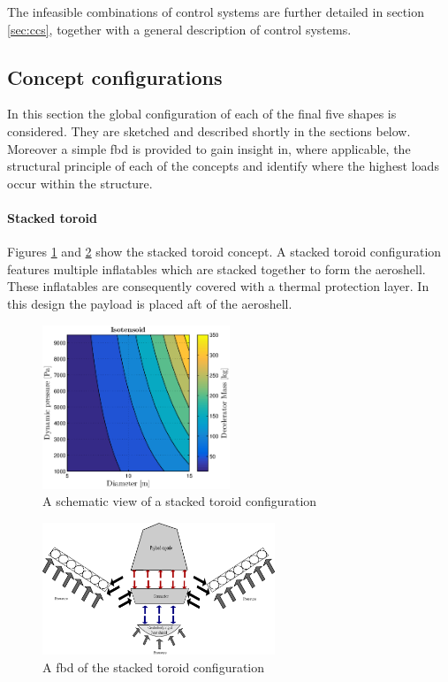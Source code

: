  The infeasible combinations of control systems are further detailed in section \ref{sec:ccs}, together with a general description of control systems. 

\subsection{Concept configurations} \label{sec:conf}
In this section the global configuration of each of the final five shapes is considered. They are sketched and described shortly in the sections below. Moreover a simple \gls{fbd} is provided to gain insight in, where applicable, the structural principle of each of the concepts and identify where the highest loads occur within the structure.

\paragraph{Stacked toroid}

Figures \ref{fig:conc_stacked} and \ref{fig:fbd_stacked} show the stacked toroid concept. A stacked toroid configuration features multiple inflatables which are stacked together to form the aeroshell. These inflatables are consequently covered with a thermal protection layer. In this design the payload is placed aft of the aeroshell.\

\begin{figure}[H]
\centering
\includegraphics[width = 0.5\textwidth]{Figure/ISO_comp.eps}
\caption{A schematic view of a stacked toroid configuration}
\label{fig:conc_stacked}
\end{figure}

\begin{figure}[H]
\centering
\includegraphics[width = 0.62\textwidth]{Figure/FBD_stacked.eps}
\caption{A \gls{fbd} of the stacked toroid configuration}
\label{fig:fbd_stacked}
\end{figure}

